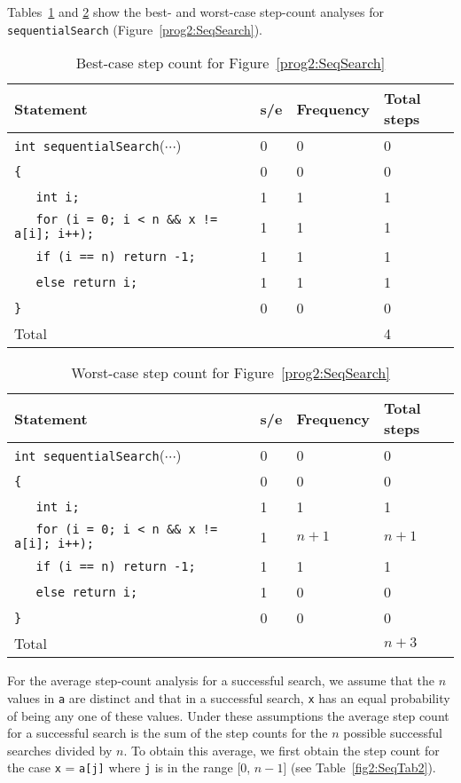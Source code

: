 
\begin{example}
\label{E2:sSearch}
Tables~\ref{fig2:SeqTable1} and \ref{fig2:SeqTable}
show
the best- and worst-case step-count analyses for
{\tt sequentialSearch} 
(Figure~\ref{prog2:SeqSearch}).

\begin{table}
\begin{tabular}{|l|lll|}
Statement & s/e & Frequency & Total steps\\ \hline
\verb?int sequentialSearch?($\cdots$) & 0 &0 & 0 \\
\verb?{? & 0 &0 & 0 \\
\verb?   int i;? & 1 &1 & 1 \\
\verb?   for (i = 0; i < n && x != a[i]; i++);? & 1 &1 & 1 \\
\verb?   if (i == n) return -1;? & 1 &1 & 1 \\
\verb?   else return i;? & 1 &1 & 1 \\
\verb?}? & 0 &0 & 0 \\ \hline
Total &  &  & 4\\
\end{tabular}
\caption{\label{fig2:SeqTable1}Best-case step count for Figure~\ref{prog2:SeqSearch}}
\end{table}

\begin{table}
\begin{tabular}{|l|lll|}
Statement & s/e & Frequency & Total steps\\ \hline
\verb?int sequentialSearch?($\cdots$) & 0 &0 & 0 \\
\verb?{? & 0 &0 & 0 \\
\verb?   int i;? & 1 &1 & 1 \\
\verb?   for (i = 0; i < n && x != a[i]; i++);? & 1 &$n+1$ & $n+1$ \\
\verb?   if (i == n) return -1;? & 1 &1 & 1 \\
\verb?   else return i;? & 1 &0 & 0 \\
\verb?}? & 0 &0 & 0 \\ \hline
Total &  &  & $  n+3$\\
\end{tabular}
\caption{\label{fig2:SeqTable}Worst-case step count for Figure~\ref{prog2:SeqSearch}}
\end{table}

 
For the average step-count analysis for a successful search,
we assume that the $n$
values in {\tt a} are distinct and that
in a successful search, {\tt x} has an equal probability
of being any one of these values.
Under these assumptions the average step count for a successful search
is the
sum of the step counts for the $n$
possible successful searches divided by $n$.
To obtain this average, we first obtain the step count for the case
{\tt x} = {\tt a[j]} where {\tt j} is in the range [0, $n-1$]
(see Table~\ref{fig2:SeqTab2}).


\end{example}
